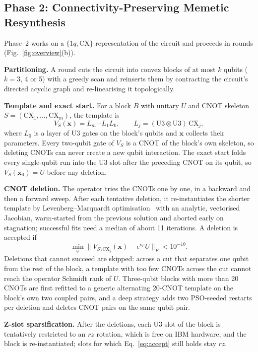 \documentclass[conference,letterpaper]{IEEEtran}
\newcommand{\U}{\mathrm{U3}}
\begin{document}
\subsection{Phase 2: Connectivity-Preserving Memetic Resynthesis}\label{sec:phase2}
Phase~2 works on a $\{1q, \mathrm{CX}\}$ representation of the circuit and proceeds in rounds
(Fig.~\ref{fig:overview}(b)).

\textbf{Partitioning.} A round cuts the circuit into convex blocks of at most $k$ qubits ($k = 3$, 4 or 5)
with a greedy scan and reinserts them by contracting the circuit's directed acyclic graph and re-linearising
it topologically.

\textbf{Template and exact start.} For a block $B$ with unitary $U$ and CNOT skeleton
$S = (\mathrm{CX}_1, \ldots, \mathrm{CX}_m)$, the template is
\begin{equation}
V_S(\mathbf{x}) = L_m\cdots L_1 L_0,\qquad L_j = (\U\otimes\U)\,\mathrm{CX}_j,
\end{equation}
where $L_0$ is a layer of U3 gates on the block's qubits and $\mathbf{x}$ collects their parameters. Every
two-qubit gate of $V_S$ is a CNOT of the block's own skeleton, so deleting CNOTs can never create a new qubit
interaction. The exact start folds every single-qubit run into the U3 slot after the preceding CNOT on its
qubit, so $V_S(\mathbf{x}_0) = U$ before any deletion.

\textbf{CNOT deletion.} The operator tries the CNOTs one by one, in a backward and then a forward sweep.
After each tentative deletion, it re-instantiates the shorter template by Levenberg--Marquardt
optimisation~\cite{nocedal} with an analytic, vectorised Jacobian, warm-started from the previous solution
and aborted early on stagnation; successful fits need a median of about 11 iterations. A deletion is
accepted if
\begin{equation}\label{eq:accept}
\min_{\varphi}\bigl\|V_{S\setminus \mathrm{CX}_j}(\mathbf{x}) - e^{i\varphi}U\bigr\|_F < 10^{-10}.
\end{equation}
Deletions that cannot succeed are skipped: across a cut that separates one qubit from the rest of the block,
a template with too few CNOTs across the cut cannot reach the operator Schmidt rank of $U$. Three-qubit
blocks with more than 20 CNOTs are first refitted to a generic alternating 20-CNOT template on the block's
own two coupled pairs, and a deep strategy adds two PSO-seeded restarts per deletion and deletes CNOT pairs
on the same qubit pair.

\textbf{Z-slot sparsification.} After the deletions, each U3 slot of the block is tentatively restricted to
an $rz$ rotation, which is free on IBM hardware, and the block is re-instantiated; slots for which
Eq.~\eqref{eq:accept} still holds stay $rz$.
\end{document}
